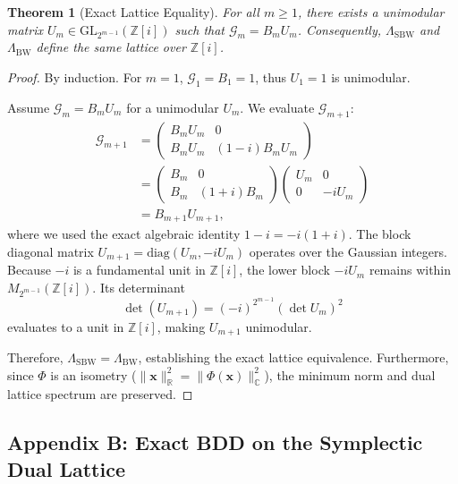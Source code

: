 \documentclass[aps,prl,twocolumn,superscriptaddress]{revtex4-2}
\newtheorem{theorem}{Theorem}
\newcommand{\bvec}[1]{\boldsymbol{#1}}
\begin{document}
\begin{theorem}[Exact Lattice Equality]\label{thm:lattice-eq}
For all $m \geq 1$, there exists a unimodular matrix $U_m \in \mathrm{GL}_{2^{m-1}}(\mathbb{Z}[i])$ such that $\mathcal{G}_m = B_m U_m$. Consequently, $\Lambda_{\mathrm{SBW}}$ and $\Lambda_{\mathrm{BW}}$ define the same lattice over $\mathbb{Z}[i]$.
\end{theorem}

\begin{proof}
By induction. For $m=1$, $\mathcal{G}_1 = B_1 = 1$, thus $U_1 = 1$ is unimodular.

Assume $\mathcal{G}_m = B_m U_m$ for a unimodular $U_m$. We evaluate $\mathcal{G}_{m+1}$:
\begin{align}
\mathcal{G}_{m+1}
&= \begin{pmatrix} B_m U_m & 0 \\ B_m U_m & (1-i)B_m U_m \end{pmatrix} \nonumber \\
&= \begin{pmatrix} B_m & 0 \\ B_m & (1+i)B_m \end{pmatrix}
   \begin{pmatrix} U_m & 0 \\ 0 & -i U_m \end{pmatrix} \nonumber \\
&= B_{m+1} U_{m+1},
\end{align}
where we used the exact algebraic identity $1-i = -i(1+i)$. The block diagonal matrix $U_{m+1} = \mathrm{diag}(U_m, -i U_m)$ operates over the Gaussian integers. Because $-i$ is a fundamental unit in $\mathbb{Z}[i]$, the lower block $-i U_m$ remains within $M_{2^{m-1}}(\mathbb{Z}[i])$. Its determinant
\begin{equation}
\det(U_{m+1}) = (-i)^{2^{m-1}} (\det U_m)^2
\end{equation}
evaluates to a unit in $\mathbb{Z}[i]$, making $U_{m+1}$ unimodular.

Therefore, $\Lambda_{\mathrm{SBW}} = \Lambda_{\mathrm{BW}}$, establishing the exact lattice equivalence. Furthermore, since $\Phi$ is an isometry ($\|\bvec{x}\|_{\mathbb{R}}^2 = \|\Phi(\bvec{x})\|_{\mathbb{C}}^2$), the minimum norm and dual lattice spectrum are preserved.
\end{proof}

\subsection*{Appendix B: Exact BDD on the Symplectic Dual Lattice}
\label{app:bdd}
\end{document}
